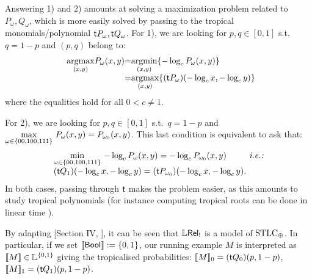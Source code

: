 Answering 1) and 2) amounts at solving a maximization problem related to $P_{\omega}, Q_\omega$, which is more easily solved by 
passing to the tropical monomials/polynomial $\mathsf{t} P_{\omega},\mathsf{t} Q_{\omega}$. 
For 1), we are looking for $p,q\in[0,1]$ s.t.\ $q=1-p$ and $(p,q)$ belong to:
\begin{equation}
  \begin{array}{r@{}c@{}l@{}}
   \underset{(x,y)}{\RM{arg max}} P_\omega (x,y)
   & = &
   \underset{(x,y)}{\RM{arg min}}\set{-\log_c P_\omega (x,y)}
   \\
   & = &
   \underset{(x,y)}{\RM{arg max}}\set{(\trop P_\omega) (-\log_c x,-\log_c y)} \label{eq:argmax}
  \end{array}
\end{equation}
where the equalities hold for all $0<c\neq1$.

For 2), %
we are looking for $p,q\in[0,1]$ s.t.\ $q=1-p$ and
$\max\limits_{\omega\in\{00,100,111\}} \, P_\omega(x,y) = P_{\omega_0}(x,y)$.
This last condition is equivalent to ask that:
\begin{equation}
  \begin{array}{l@{}l@{}}
    \min\limits_{\omega\in\set{00,100,111}} \, -\log_c P_\omega(x,y) = -\log_c P_{\omega_0}(x,y)
   & \textit{ i.e.: }
   \\
   (\trop Q_1)( -\log_c x, -\log_c y) = (\trop P_{\omega_0})( -\log_c x, -\log_c y). &  \label{eq:max}
  \end{array}
\end{equation}
In both cases, passing through $\trop$ %
makes the problem easier, as this amounts to study tropical polynomials (for instance computing tropical roots can be done in linear time \cite{Noferini2015}). %

\begin{remark}
 By adapting [Section IV, \cite{Manzo2013}], it can be seen that $\mathbb{L} \mathsf{Rel}_!$ is a model of $\mathrm{STLC}_\oplus$.
 In particular, if we set $\llbracket\mathsf{Bool}\rrbracket:=\{0,1\}$, our running example $M$ is interpreted as $\llbracket M\rrbracket\in\mathbb{L}^{\{0,1\}}$ giving the tropicalised probabilities: $\llbracket M\rrbracket_0=(\mathsf{t} Q_0)(p,1-p)$, $\llbracket M\rrbracket_1=(\mathsf{t} Q_1)(p,1-p)$.
\end{remark}


